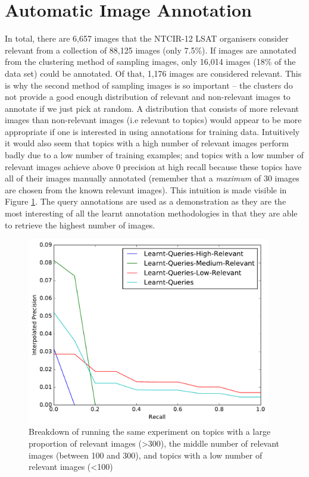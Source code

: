 \section{Automatic Image Annotation}

In total, there are 6,657 images that the NTCIR-12 LSAT organisers consider relevant from a collection of 88,125 images (only 7.5\%). If images are annotated from the clustering method of sampling images, only 16,014 images (18\% of the data set) could be annotated. Of that, 1,176 images are considered relevant. This is why the second method of sampling images is so important -- the clusters do not provide a good enough distribution of relevant and non-relevant images to annotate if we just pick at random. A distribution that consists of more relevant images than non-relevant images (i.e relevant to topics) would appear to be more appropriate if one is interested in using annotations for training data. Intuitively it would also seem that topics with a high number of relevant images perform badly due to a low number of training examples; and topics with a low number of relevant images achieve above $0$ precision at high recall because these topics have all of their images manually annotated (remember that a \textit{maximum} of $30$ images are chosen from the known relevant images). This intuition is made visible in Figure \ref{fig:learnt-queries}. The query annotations are used as a demonstration as they are the most interesting of all the learnt annotation methodologies in that they are able to retrieve the highest number of images.

\begin{figure}[h]
    \centering
    \includegraphics[width=0.95\textwidth]{graphs/learnt-queries}
    \caption{Breakdown of running the same experiment on topics with a large proportion of relevant images (\textgreater 300), the middle number of relevant images (between 100 and 300), and topics with a low number of relevant images (\textless 100)}
    \label{fig:learnt-queries}
\end{figure}

